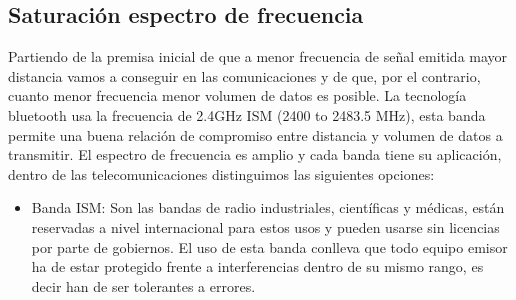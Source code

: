 \documentclass[a4paper ,12pt, onecolumn]{article}
\begin{document}
    \subsection{Saturación espectro de frecuencia}
            Partiendo de la premisa inicial de que a menor frecuencia de señal emitida mayor distancia vamos a conseguir 
            en las comunicaciones y de que, por el contrario, cuanto menor frecuencia menor volumen de datos es posible.
            La tecnología bluetooth usa la frecuencia de 2.4GHz ISM (2400 to 2483.5 MHz), esta banda permite una buena relación
            de compromiso entre distancia y volumen de datos a transmitir.
            El espectro de frecuencia es amplio y cada banda tiene su aplicación, dentro de las telecomunicaciones
            distinguimos las siguientes opciones:
            \begin{itemize}
                \item Banda ISM: Son las bandas de radio industriales, científicas y médicas, están reservadas a 
                nivel internacional para estos usos y pueden usarse sin licencias por parte de gobiernos. El uso de esta
                banda conlleva que todo equipo emisor ha de estar protegido frente a interferencias dentro de su mismo 
                rango, es decir han de ser tolerantes a errores.
    

\end{itemize}
\end{document}
